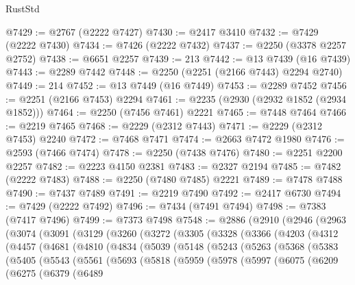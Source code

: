 \begin{lexlean}{RustStd}
\begin{coremodule}
{\begin{coremodule}
{{{{{{{{{{{{{{{{{{{{{{{{{{{{{{{{{{{{{{{{{{{{{{{{{{{{{@7429 := @2767 (@2222 @7427)
@7430 := @2417 @3410
@7432 := @7429 (@2222 @7430)
@7434 := @7426 (@2222 @7432)
@7437 := @2250 (@3378 @2257 @2752)
@7438 := @6651 @2257
@7439 := 213
@7442 := @13 @7439 (@16 @7439)
@7443 := @2289 @7442
@7448 := @2250 (@2251 (@2166 @7443) @2294 @2740)
@7449 := 214
@7452 := @13 @7449 (@16 @7449)
@7453 := @2289 @7452
@7456 := @2251 (@2166 @7453) @2294
@7461 := @2235 (@2930 (@2932 @1852 (@2934 @1852)))
@7464 := @2250 (@7456 @7461) @2221
@7465 := @7448 @7464
@7466 := @2219 @7465
@7468 := @2229 (@2312 @7443)
@7471 := @2229 (@2312 @7453) @2240
@7472 := @7468 @7471
@7474 := @2663 @7472 @1980
@7476 := @2593 (@7466 @7474)
@7478 := @2250 (@7438 @7476)
@7480 := @2251 @2200 @2257
@7482 := @2223 @4150 @2381
@7483 := @2327 @2194
@7485 := @7482 (@2222 @7483)
@7488 := @2250 (@7480 @7485) @2221
@7489 := @7478 @7488
@7490 := @7437 @7489
@7491 := @2219 @7490
@7492 := @2417 @6730
@7494 := @7429 (@2222 @7492)
@7496 := @7434 (@7491 @7494)
@7498 := @7383 (@7417 @7496)
@7499 := @7373 @7498
@7548 := @2886
    (@2910
      (@2946
        (@2963
          (@3074
            (@3091
              (@3129
                (@3260
                  (@3272
                    (@3305
                      (@3328
                        (@3366
                          (@4203
                            (@4312
                              (@4457
                                (@4681
                                  (@4810
                                    (@4834
                                      (@5039
                                        (@5148
                                          (@5243
                                            (@5263
                                              (@5368
                                                (@5383
                                                  (@5405
                                                    (@5543
                                                      (@5561
                                                        (@5693
                                                          (@5818
                                                            (@5959
                                                              (@5978
                                                                (@5997
                                                                  (@6075
                                                                    (@6209
                                                                      (@6275
                                                                        (@6379
                                                                          (@6489
}}}}}}}}}}}}}}}}}}}}}}}}}}}}}}}}}}}}}}}}}}}}}}}}}}}}}
\end{coremodule}}
\end{coremodule}
\end{lexlean}
